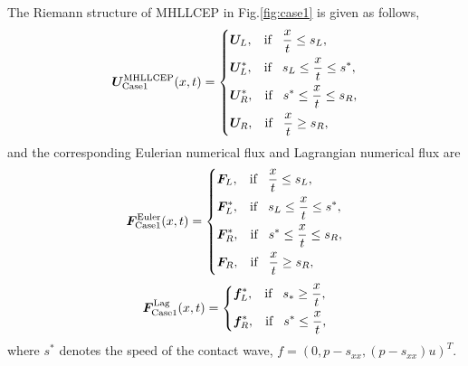 \documentclass{article}
\numberwithin{equation}{section}
\numberwithin{table}{section}
\begin{document}
The Riemann structure of MHLLCEP in Fig.\ref{fig:case1} is given as follows,
\begin{equation}\label{eq:HLLCEP}
  \bm{U}^{\text{MHLLCEP}}_{\text{Case1}}(x,t) = \left\{ \begin{aligned}
		& \bm{U}_L, \hspace{0.3cm} \text{if} \hspace{0.3cm} \frac{x}{t}\le s_L, \\
		& \bm{U}_L^*, \hspace{0.3cm} \text{if} \hspace{0.3cm} s_L\le \frac{x}{t} \le s^*, \\
		& \bm{U}_R^*, \hspace{0.3cm} \text{if} \hspace{0.3cm} s^*\le \frac{x}{t} \le s_R,\\
		& \bm{U}_R, \hspace{0.3cm} \text{if} \hspace{0.3cm} \frac{x}{t}\ge s_R, \\
	  \end{aligned}
	\right.
  \end{equation}
  and the corresponding Eulerian numerical flux and Lagrangian numerical flux are
 \begin{equation}
	\bm{F}^{\text{Euler}}_{\text{Case1}}(x,t) = \left\{ \begin{aligned}
		& \bm{F}_L, \hspace{0.3cm} \text{if} \hspace{0.3cm} \frac{x}{t}\le s_L, \\
		& \bm{F}_L^*, \hspace{0.3cm} \text{if} \hspace{0.3cm} s_L\le \frac{x}{t} \le s^*, \\
		& \bm{F}_R^*, \hspace{0.3cm} \text{if} \hspace{0.3cm} s^*\le \frac{x}{t} \le s_R,\\
		& \bm{F}_R, \hspace{0.3cm} \text{if} \hspace{0.3cm} \frac{x}{t}\ge s_R, \\
	  \end{aligned}
	\right.
  \end{equation}
\begin{equation}
	\bm{F}^{\text{Lag}}_{\text{Case1}}(x,t) = \left\{ \begin{aligned}
		& \bm{f}_L^*, \hspace{0.3cm} \text{if} \hspace{0.3cm} s_*\ge \frac{x}{t},\\
		& \bm{f}_R^*, \hspace{0.3cm} \text{if} \hspace{0.3cm} s^*\le \frac{x}{t},\\
	  \end{aligned}
	\right.
  \end{equation}
where $s^*$ denotes the speed of the contact wave, $f=(0,p-s_{xx},(p-s_{xx})u)^{T}$.
\end{document}
